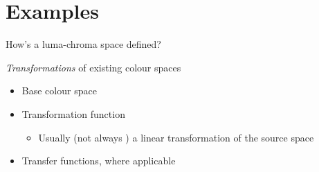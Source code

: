 \documentclass[aspectratio=169,usepdftitle=false]{fireshonks}
\begin{document}
\section{Examples}
\begin{frame}{How's a luma-chroma space defined?}
    \begin{center}
        \emph{Transformations} of existing colour spaces
    \end{center}
    \begin{itemize}
        \item Base colour space
        \item Transformation function
              \begin{itemize}
                  \item Usually (not always ) a linear transformation of the source space
              \end{itemize}
        \item Transfer functions, where applicable
    \end{itemize}
\end{frame}
\end{document}
